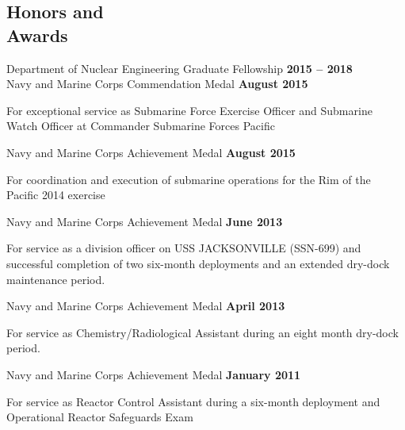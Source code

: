 \documentclass[margin,line]{resume}
\begin{document}
\begin{resume}
    \section{\mysidestyle Honors and\\Awards}
    Department of Nuclear Engineering Graduate Fellowship \hfill \textbf{2015 -- 2018}\\%
    Navy and Marine Corps Commendation Medal \hfill \textbf{August 2015}\\\vspace{-3.5mm}
        \begin{list2}
        \item[] For exceptional service as Submarine Force Exercise Officer and Submarine Watch Officer at Commander Submarine Forces Pacific
        \end{list2}\vspace{-3mm}
    Navy and Marine Corps Achievement Medal \hfill \textbf{August 2015}\\\vspace{-3.5mm}
        \begin{list2}
        \item[] For coordination and execution of submarine operations for the Rim of the Pacific 2014 exercise
        \end{list2}\vspace{-3mm}
    Navy and Marine Corps Achievement Medal \hfill \textbf{June 2013}\\\vspace{-3.5mm}
        \begin{list2}
        \item[] For service as a division officer on USS JACKSONVILLE (SSN-699) and successful completion of two six-month deployments and an extended dry-dock maintenance period.
        \end{list2}\vspace{-3mm}
    Navy and Marine Corps Achievement Medal \hfill \textbf{April 2013}\\\vspace{-3.5mm}
        \begin{list2}
        \item[] For service as Chemistry/Radiological Assistant during an eight month dry-dock period.
        \end{list2}\vspace{-3mm}
    Navy and Marine Corps Achievement Medal \hfill \textbf{January 2011}\\\vspace{-3.5mm}
        \begin{list2}
        \item[] For service as Reactor Control Assistant during a six-month deployment and Operational Reactor Safeguards Exam
        \end{list2}             \vspace{-3mm}           


\end{resume}
\end{document}
